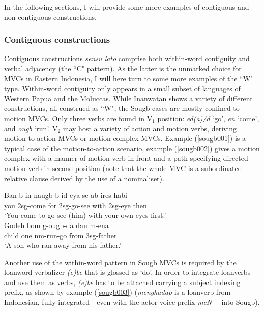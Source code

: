 In the following sections, I will provide some more examples of contiguous and non-contiguous constructions. 

\subsubsection{Contiguous constructions}

Contiguous constructions \textit{sensu lato} comprise both within-word contiguity and verbal adjacency (the ``C" pattern). As the latter is the unmarked choice for MVCs in Eastern Indonesia, I will here turn to some more examples of the ``W" type. Within-word contiguity only appears in a small subset of languages of Western Papua and the Moluccas. While Inanwatan shows a variety of different constructions, all construed as ``W", the Sougb cases are mostly confined to motion MVCs. Only three verbs are found in V$_1$ position: \textit{ed(a)/d} `go', \textit{en} `come', and \textit{ougb} `run'. V$_2$ may host a variety of action and motion verbs, deriving motion-to-action MVCs or motion complex MVCs. Example (\ref{sougb001}) is a typical case of the motion-to-action scenario, example (\ref{sougb002}) gives a motion complex with a manner of motion verb in front and a path-specifying directed motion verb in second position (note that the whole MVC is a subordinated relative clause derived by the use of a nominaliser).

\ea \label{sougb001}
\gll Ban b-in naugb b-id-eya se ab-ires habi \\
you 2\acs{sg}-come for 2\acs{sg}-go-see with 2\acs{sg}-eye then \\
\glft `You come to go see (him) with your own eyes first.' \\ 
\z
\xe
\ea \label{sougb002}
\gll Godeh hom g-ougb-da dau m-ena \\
child one \acs{nm}-run-go from 3\acs{sg}-father \\
\glft `A son who ran away from his father.' \\ 
\z
\xe

Another use of the within-word pattern in Sougb MVCs is required by the loanword verbalizer \textit{(e)be} that is glossed as `do'. In order to integrate loanverbs and use them as verbs, \textit{(e)be} has to be attached carrying a subject indexing prefix, as shown by example (\ref{sougb003}) (\textit{menghadap} is a loanverb from Indonesian, fully integrated - even with the actor voice prefix \textit{meN-} - into Sougb).

